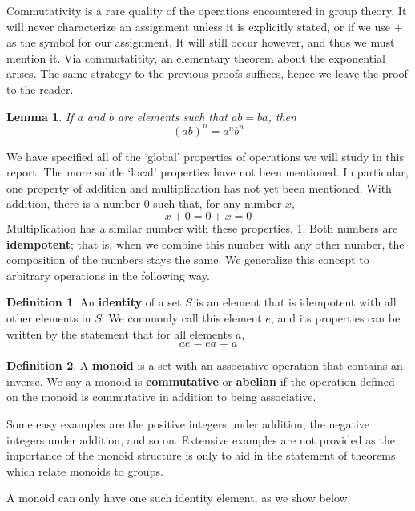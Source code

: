 \documentclass[12pt]{amsbook}
\theoremstyle{plain}
\newtheorem{lemma}[theorem]{Lemma}
\theoremstyle{definition}
\newtheorem{definition}{Definition}
\begin{document}
Commutativity is a rare quality of the operations encountered in group theory. It will never characterize an assignment unless it is explicitly stated, or if we use $+$ as the symbol for our assignment. It will still occur however, and thus we must mention it. Via commutatitity, an elementary theorem about the exponential arises. The same strategy to the previous proofs suffices, hence we leave the proof to the reader.

\begin{lemma}
    If $a$ and $b$ are elements such that $ab = ba$, then
    \[ (ab)^n = a^nb^n \]
\end{lemma}

We have specified all of the `global' properties of operations we will study in this report. The more subtle `local' properties have not been mentioned. In particular, one property of addition and multiplication has not yet been mentioned. With addition, there is a number 0 such that, for any number $x$,
%
\[x + 0 = 0 + x = 0\]
%
Multiplication has a similar number with these properties, 1. Both numbers are {\bf idempotent}; that is, when we combine this number with any other number, the composition of the numbers stays the same. We generalize this concept to arbitrary operations in the following way.

\begin{definition}
    An {\bf identity} of a set $S$ is an element that is idempotent with all other elements in $S$. We commonly call this element $e$, and its properties can be written by the statement that for all elements $a$,
    \[ ae = ea = a \]
\end{definition}

\begin{definition}
    A {\bf monoid} is a set with an associative operation that contains an inverse. We say a monoid is {\bf commutative} or {\bf abelian} if the operation defined on the monoid is commutative in addition to being associative.
\end{definition}

Some easy examples are the positive integers under addition, the negative integers under addition, and so on. Extensive examples are not provided as the importance of the monoid structure is only to aid in the statement of theorems which relate monoids to groups.

A monoid can only have one such identity element, as we show below.
\end{document}
